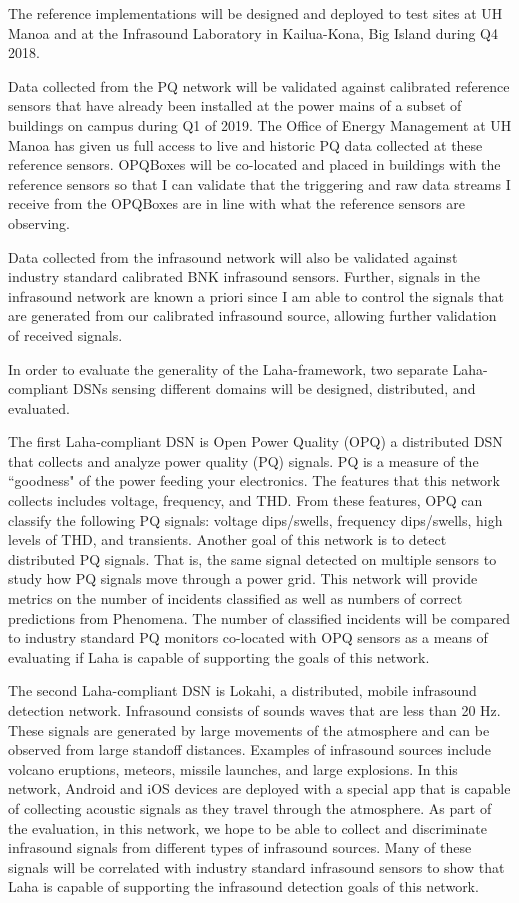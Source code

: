 The reference implementations will be designed and deployed to test sites at UH Manoa and at the Infrasound Laboratory in Kailua-Kona, Big Island during Q4 2018. 

Data collected from the PQ network will be validated against calibrated reference sensors that have already been installed at the power mains of a subset of buildings on campus during Q1 of 2019. The Office of Energy Management at UH Manoa has given us full access to live and historic PQ data collected at these reference sensors. OPQBoxes will be co-located and placed in buildings with the reference sensors so that I can validate that the triggering and raw data streams I receive from the OPQBoxes are in line with what the reference sensors are observing.

Data collected from the infrasound network will also be validated against industry standard calibrated BNK infrasound sensors. Further, signals in the infrasound network are known a priori since I am able to control the signals that are generated from our calibrated infrasound source, allowing further validation of received signals.

In order to evaluate the generality of the Laha-framework, two separate Laha-compliant DSNs sensing different domains will be designed, distributed, and evaluated. 

The first Laha-compliant DSN is Open Power Quality (OPQ) a distributed DSN that collects and analyze power quality (PQ) signals. PQ is a measure of the ``goodness" of the power feeding your electronics. The features that this network collects includes voltage, frequency, and THD. From these features, OPQ can classify the following PQ signals: voltage dips/swells, frequency dips/swells, high levels of THD, and transients. Another goal of this network is to detect distributed PQ signals. That is, the same signal detected on multiple sensors to study how PQ signals move through a power grid. This network will provide metrics on the number of incidents classified as well as numbers of correct predictions from Phenomena. The number of classified incidents will be compared to industry standard PQ monitors co-located with OPQ sensors as a means of evaluating if Laha is capable of supporting the goals of this network.

The second Laha-compliant DSN is Lokahi, a distributed, mobile infrasound detection network. Infrasound consists of sounds waves that are less than 20 Hz. These signals are generated by large movements of the atmosphere and can be observed from large standoff distances. Examples of infrasound sources include volcano eruptions, meteors, missile launches, and large explosions. In this network, Android and iOS devices are deployed with a special app that is capable of collecting acoustic signals as they travel through the atmosphere. As part of the evaluation, in this network, we hope to be able to collect and discriminate infrasound signals from different types of infrasound sources. Many of these signals will be correlated with industry standard infrasound sensors to show that Laha is capable of supporting the infrasound detection goals of this network.

